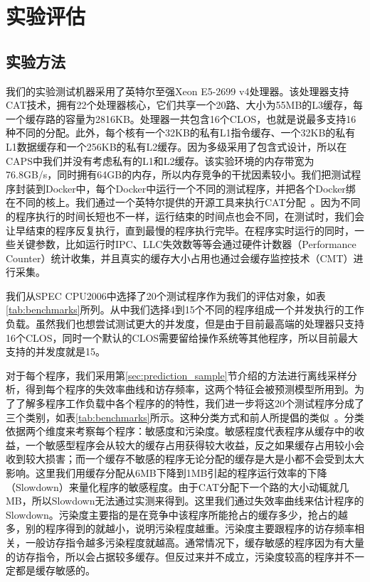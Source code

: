 
\chapter{实验评估} \label{chap:evaluation}

\section{实验方法}

我们的实验测试机器采用了英特尔至强Xeon E5-2699 v4处理器。该处理器支持CAT技术，拥有22个处理器核心，它们共享一个20路、大小为55MB的L3缓存，每一个缓存路的容量为2816KB。处理器一共包含16个CLOS，也就是说最多支持16种不同的分配。此外，每个核有一个32KB的私有L1指令缓存、一个32KB的私有L1数据缓存和一个256KB的私有L2缓存。因为多级采用了包含式设计，所以在CAPS中我们并没有考虑私有的L1和L2缓存。该实验环境的内存带宽为76.8GB/s，同时拥有64GB的内存，所以内存竞争的干扰因素较小。我们把测试程序封装到Docker中，每个Docker中运行一个不同的测试程序，并把各个Docker绑在不同的核上。我们通过一个英特尔提供的开源工具来执行CAT分配~\parencite{pqos}。因为不同的程序执行的时间长短也不一样，运行结束的时间点也会不同，在测试时，我们会让早结束的程序反复执行，直到最慢的程序执行完毕。在程序实时运行的同时，一些关键参数，比如运行时IPC、LLC失效数等等会通过硬件计数器（Performance Counter）统计收集，并且真实的缓存大小占用也通过会缓存监控技术（CMT）进行采集。

我们从SPEC CPU2006中选择了20个测试程序作为我们的评估对象，如表\ref{tab:benchmarks}所列。从中我们选择4到15个不同的程序组成一个并发执行的工作负载。虽然我们也想尝试测试更大的并发度，但是由于目前最高端的处理器只支持16个CLOS，同时一个默认的CLOS需要留给操作系统等其他程序，所以目前最大支持的并发度就是15。

对于每个程序，我们采用第\ref{sec:prediction_sample}节介绍的方法进行离线采样分析，得到每个程序的失效率曲线和访存频率，这两个特征会被预测模型所用到。为了了解多程序工作负载中各个程序的的特性，我们进一步将这20个测试程序分成了三个类别，如表\ref{tab:benchmarks}所示。这种分类方式和前人所提倡的类似~\parencite{lin2008gaining}。分类依据两个维度来考察每个程序：敏感度和污染度。敏感程度代表程序从缓存中的收益，一个敏感型程序会从较大的缓存占用获得较大收益，反之如果缓存占用较小会收到较大损害；而一个缓存不敏感的程序无论分配的缓存是大是小都不会受到太大影响。这里我们用缓存分配从6MB下降到1MB引起的程序运行效率的下降（Slowdown）来量化程序的敏感程度。由于CAT分配下一个路的大小动辄就几MB，所以Slowdown无法通过实测来得到。这里我们通过失效率曲线来估计程序的Slowdown。污染度主要指的是在竞争中该程序所能抢占的缓存多少，抢占的越多，别的程序得到的就越小，说明污染程度越重。污染度主要跟程序的访存频率相关，一般访存指令越多污染程度就越高。通常情况下，缓存敏感的程序因为有大量的访存指令，所以会占据较多缓存。但反过来并不成立，污染度较高的程序并不一定都是缓存敏感的。

